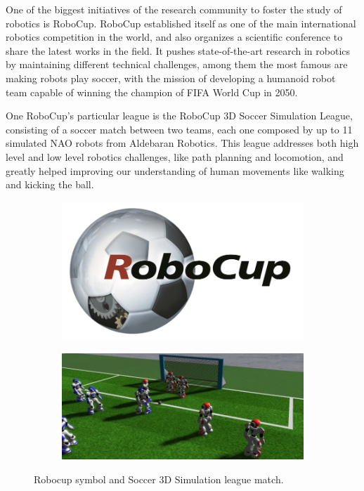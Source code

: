 
One of the biggest initiatives of the research community to foster the study of robotics is RoboCup. RoboCup established itself as one of the main international robotics competition in the world, and also organizes a scientific conference to share the latest works in the field. It pushes state-of-the-art research in robotics by maintaining different technical challenges, among them the most famous are making robots play soccer, with the mission of developing a humanoid robot team capable of winning the champion of FIFA World Cup in 2050.

One RoboCup's particular league is the RoboCup 3D Soccer Simulation League, consisting of a soccer match between two teams, each one composed by up to 11 simulated NAO robots from Aldebaran Robotics. This league addresses both high level and low level robotics challenges, like path planning and locomotion, and greatly helped improving our understanding of human movements like walking and kicking the ball.

\begin{figure}[ht]
  	\centering
  	\begin{subfigure}[b]{0.45\textwidth}
              \centering
	 		\includegraphics[height=0.13\textheight]{Chapter1/RoboCup.png}	
     \end{subfigure}
     
	 \begin{subfigure}[b]{0.45\textwidth}
              \centering
	 		\includegraphics[height=0.13\textheight]{Chapter1/SS3D.png}
	 \end{subfigure}
	     
	 \caption{Robocup symbol and Soccer 3D Simulation league match.}
	\label{fig:robocup}
\end{figure}

